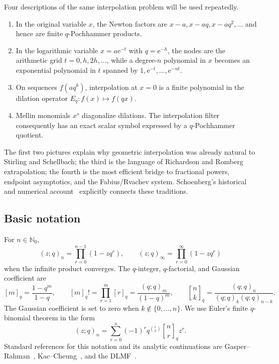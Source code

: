 \documentclass[11pt,a4paper,oneside]{article}
\theoremstyle{definition}
\theoremstyle{remark}
\newcommand{\N}{\mathbb N}
\newcommand{\e}{\mathrm e}
\newcommand{\qbinom}[3]{\genfrac{[}{]}{0pt}{}{#1}{#2}_{#3}}
\begin{document}
Four descriptions of the same interpolation problem will be used repeatedly.

\begin{enumerate}
\item In the original variable $x$, the Newton factors are
      $x-a,x-aq,x-aq^2,\ldots$ and hence are finite $q$-Pochhammer products.
\item In the logarithmic variable $x=a\e^{-t}$ with $q=\e^{-h}$, the nodes are
      the arithmetic grid $t=0,h,2h,\ldots$, while a degree-$n$ polynomial in
      $x$ becomes an exponential polynomial in $t$ spanned by
      $1,\e^{-t},\ldots,\e^{-nt}$.
\item On sequences $f(aq^k)$, interpolation at $x=0$ is a finite polynomial in
      the dilation operator $E_q:f(x)\mapsto f(qx)$.
\item Mellin monomials $x^s$ diagonalize dilations.  The interpolation filter
      consequently has an exact scalar symbol expressed by a $q$-Pochhammer
      quotient.
\end{enumerate}

The first two pictures explain why geometric interpolation was already natural
to Stirling and Schellbach; the third is the language of Richardson and
Romberg extrapolation; the fourth is the most efficient bridge to fractional
powers, endpoint asymptotics, and the Fabius/Rvachev system.  Schoenberg's
historical and numerical account~\cite{Schoenberg1981} explicitly connects
these traditions.

\subsection{Basic notation}

For $n\in\N_0$,
\[
 (z;q)_n=\prod_{r=0}^{n-1}(1-zq^r),
 \qquad
 (z;q)_\infty=\prod_{r=0}^{\infty}(1-zq^r)
\]
when the infinite product converges.  The $q$-integer, $q$-factorial, and
Gaussian coefficient are
\[
 [m]_q=\frac{1-q^m}{1-q},\qquad
 [m]_q!=\prod_{r=1}^m[r]_q=\frac{(q;q)_m}{(1-q)^m},
 \qquad
 \qbinom nkq=\frac{(q;q)_n}{(q;q)_k(q;q)_{n-k}}.
\]
The Gaussian coefficient is set to zero when $k\notin\{0,\ldots,n\}$.  We use
Euler's finite $q$-binomial theorem in the form
\begin{equation}
 (z;q)_n=\sum_{r=0}^n(-1)^rq^{\binom r2}\qbinom nrq z^r.
 \label{eq:finite-qbinomial}
\end{equation}
Standard references for this notation and its analytic continuations are
Gasper--Rahman~\cite{GasperRahman2004}, Kac--Cheung~\cite{KacCheung2002}, and
the DLMF~\cite{DLMF17}.
\end{document}
